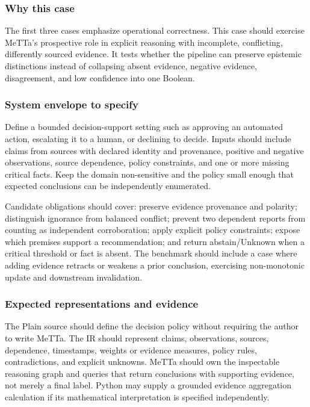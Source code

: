 \documentclass[11pt]{article}
\begin{document}
\subsubsection*{Why this case}

The first three cases emphasize operational correctness.  This case should
exercise MeTTa's prospective role in explicit reasoning with incomplete,
conflicting, differently sourced evidence.  It tests whether the pipeline can
preserve epistemic distinctions instead of collapsing absent evidence,
negative evidence, disagreement, and low confidence into one Boolean.

\subsubsection*{System envelope to specify}

Define a bounded decision-support setting such as approving an automated
action, escalating it to a human, or declining to decide.  Inputs should
include claims from sources with declared identity and provenance, positive
and negative observations, source dependence, policy constraints, and one or
more missing critical facts.  Keep the domain non-sensitive and the policy
small enough that expected conclusions can be independently enumerated.

Candidate obligations should cover: preserve evidence provenance and polarity;
distinguish ignorance from balanced conflict; prevent two dependent reports
from counting as independent corroboration; apply explicit policy constraints;
expose which premises support a recommendation; and return abstain/Unknown
when a critical threshold or fact is absent.  The benchmark should include a
case where adding evidence retracts or weakens a prior conclusion, exercising
non-monotonic update and downstream invalidation.

\subsubsection*{Expected representations and evidence}

The Plain source should define the decision policy without requiring the
author to write MeTTa.  The IR should represent claims, observations, sources,
dependence, timestamps, weights or evidence measures, policy rules,
contradictions, and explicit unknowns.  MeTTa should own the inspectable
reasoning graph and queries that return conclusions with supporting evidence,
not merely a final label.  Python may supply a grounded evidence aggregation
calculation if its mathematical interpretation is specified independently.
\end{document}
